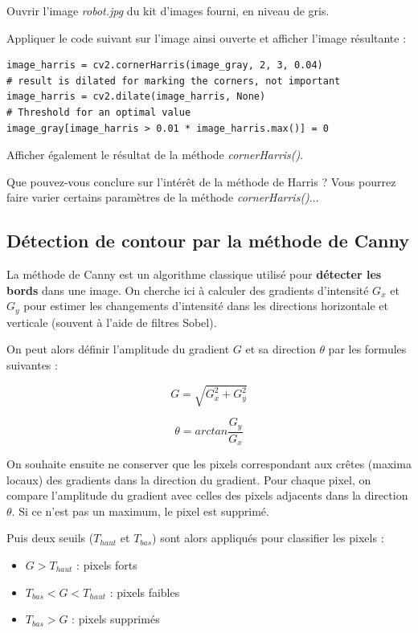 \documentclass[a4paper,11pt,titlepage]{article} %
\begin{document}
\medskip

\Manip Ouvrir l'image \textsl{robot.jpg} du kit d'images fourni, en niveau de gris. 

\Manip Appliquer le code suivant sur l'image ainsi ouverte et afficher l'image résultante :

\begin{lstlisting}
image_harris = cv2.cornerHarris(image_gray, 2, 3, 0.04)
# result is dilated for marking the corners, not important
image_harris = cv2.dilate(image_harris, None)
# Threshold for an optimal value
image_gray[image_harris > 0.01 * image_harris.max()] = 0
\end{lstlisting}

\Manip Afficher également le résultat de la méthode \textsl{cornerHarris()}.

\Quest Que pouvez-vous conclure sur l'intérêt de la méthode de Harris ? Vous pourrez faire varier certains paramètres de la méthode \textsl{cornerHarris()}...


\subsection{Détection de contour par la méthode de Canny}

La méthode de Canny est un algorithme classique utilisé pour \textbf{détecter les bords} dans une image. On cherche ici à calculer des gradients d'intensité $G_x$ et $G_y$ pour estimer les changements d'intensité dans les directions horizontale et verticale (souvent à l'aide de filtres Sobel).

On peut alors définir l'amplitude du gradient $G$ et sa direction $\theta$ par les formules suivantes : 

$$G = \sqrt{G_x^2 + G_y^2}$$

$$\theta = arctan \frac{G_y}{G_x}$$

 
On souhaite ensuite ne conserver que les pixels correspondant aux crêtes (maxima locaux) des gradients dans la direction du gradient. Pour chaque pixel, on compare l'amplitude du gradient avec celles des pixels adjacents dans la direction $\theta$. Si ce n'est pas un maximum, le pixel est supprimé.

Puis deux seuils ($T_{haut}$ et $T_{bas}$) sont alors appliqués pour classifier les pixels :

\begin{itemize}
	\item $G > T_{haut}$ : pixels forts
	\item $T_{bas} < G < T_{haut}$ : pixels faibles
	\item $T_{bas} > G$ : pixels supprimés
\end{itemize}
\end{document}
